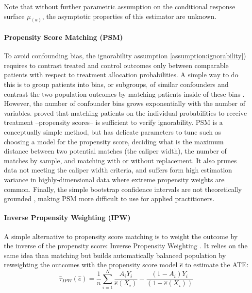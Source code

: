 \documentclass[french,12pt,twoside,a4paper]{book}
\begin{document}
\begin{appendices}
  Note that without further parametric assumption on the conditional response
  surface $\mu_{(a)}$, the asymptotic properties of this estimator are unknown.

  \paragraph{Propensity Score Matching (PSM)} To avoid confounding bias, the
  ignorability assumption \ref{assumption:ignorability}) requires to contrast
  treated and control outcomes only between comparable patients with respect to
  treatment allocation probabilities. A simple way to do this is to group
  patients into bins, or subgroups, of similar confounders and contrast the two
  population outcomes by matching patients inside of these bins
  \citep{stuart2010matching}. However, the number of confounder bins grows
  exponentially with the number of variables. \cite{rosenbaum_central_1983} proved
  that matching patients on the individual probabilities to receive treatment
  --propensity scores-- is sufficient to verify ignorability. PSM is a
  conceptually simple method, but has delicate parameters to tune such as
  choosing a model for the propensity score, deciding what is the maximum
  distance between two potential matches (the caliper width), the number of
  matches by sample, and matching with or without replacement. It also prunes data
  not meeting the caliper width criteria, and suffers form high estimation
  variance in highly-dimensional data where extreme propensity weights are common.
  Finally, the simple bootstrap confidence intervals are not theoretically
  grounded \citep{abadie2008failure}, making PSM more difficult
  to use for applied practitioners.


  \paragraph{Inverse Propensity Weighting (IPW)}

  A simple alternative to propensity score matching is to weight the outcome by
  the inverse of the propensity score: Inverse Propensity Weighting
  \citep{austin2015moving}. It relies on the same idea than matching but builds
  automatically balanced population by reweighting the outcomes with the
  propensity score model $\hat{e}$ to estimate the ATE:
  \begin{equation}
    \hat \tau_{IPW}(\hat e) = \frac{1}{n} \sum_{i=1}^N \frac{A_i Y_i}{\hat e(X_i)} - \frac{(1-A_i)Y_i}{(1-\hat e(X_i))}
  \end{equation}


\end{appendices}
\end{document}

